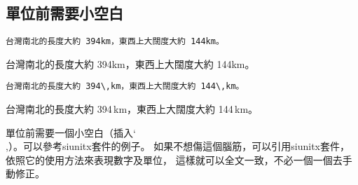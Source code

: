 \subsection{單位前需要小空白}
\label{sub:unit}

\begin{Wrong}
\begin{verbatim}
台灣南北的長度大約 394km，東西上大闊度大約 144km。
\end{verbatim}

台灣南北的長度大約 394km，東西上大闊度大約 144km。
\end{Wrong}

\begin{Right}
\begin{verbatim}
台灣南北的長度大約 394\,km，東西上大闊度大約 144\,km。
\end{verbatim}

台灣南北的長度大約 394\,km，東西上大闊度大約 144\,km。
\end{Right}

單位前需要一個小空白（插入\char`\\,）。可以參考{\sf siunitx}套件的例子。
如果不想傷這個腦筋，可以引用{\sf siunitx}套件，依照它的使用方法來表現數字及單位，
這樣就可以全文一致，不必一個一個去手動修正。
